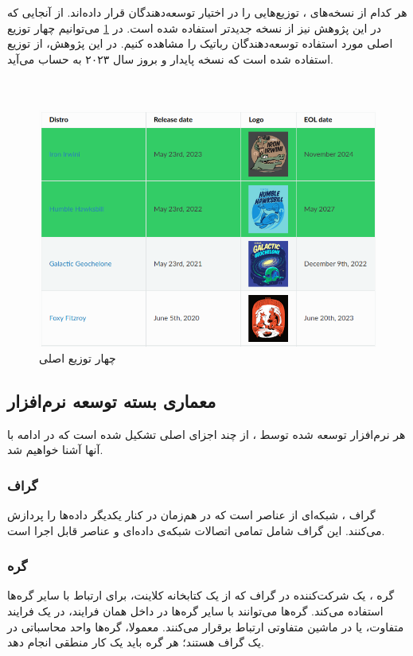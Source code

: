 هر کدام از نسخه‌های ، توزیع‌هایی را در اختیار توسعه‌دهندگان قرار داده‌اند. از آنجایی که در این پژوهش نیز از نسخه جدید‌تر  استفاده شده است. در \cref{fig:ROS2_Distributions} می‌توانیم چهار توزیع اصلی مورد استفاده توسعه‌دهندگان رباتیک را مشاهده کنیم. در این پژوهش، از توزیع  استفاده شده است که نسخه پایدار و بروز سال ۲۰۲۳ به حساب می‌آید.
\\
\\
\\
\begin{figure}[h]
    \centering
    \includegraphics[width=0.8\linewidth]{figures/ROS2_Distributions.png}
    \caption{چهار توزیع اصلی }
    \label{fig:ROS2_Distributions}
\end{figure}

\subsection{معماری بسته توسعه نرم‌افزار }
هر نرم‌افزار توسعه شده توسط ، از چند اجزای اصلی تشکیل شده است که در ادامه با آنها آشنا خواهیم شد.

\subsubsection{گراف }
گراف ، شبکه‌ای از عناصر  است که در هم‌زمان در کنار یکدیگر داده‌ها را پردازش می‌کنند. این گراف شامل تمامی اتصالات شبکه‌ی داده‌ای و عناصر قابل اجرا است. 

\subsubsection{گره }
گره ، یک شرکت‌کننده در گراف  که از یک کتابخانه کلاینت، برای ارتباط با سایر گره‌ها استفاده می‌کند. گره‌ها می‌توانند با سایر گره‌ها در داخل همان فرایند، در یک فرایند متفاوت، یا در ماشین متفاوتی ارتباط برقرار می‌کنند. معمولا، گره‌ها واحد محاسباتی در یک گراف   هستند؛ هر گره باید یک کار منطقی انجام دهد.

